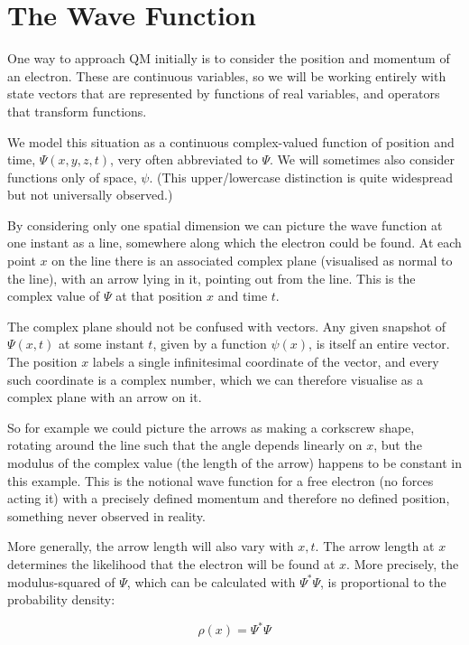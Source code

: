 \section{The Wave Function}

One way to approach QM initially is to consider the position and momentum of an electron. These are continuous variables, so we will be working entirely with state vectors that are represented by functions of real variables, and operators that transform functions.

We model this situation as a continuous complex-valued function of position and time, $\Psi(x, y, z, t)$, very often abbreviated to $\Psi$. We will sometimes also consider functions only of space, $\psi$. (This upper/lowercase distinction is quite widespread but not universally observed.)

By considering only one spatial dimension we can picture the wave function at one instant as a line, somewhere along which the electron could be found. At each point $x$ on the line there is an associated complex plane (visualised as normal to the line), with an arrow lying in it, pointing out from the line. This is the complex value of $\Psi$ at that position $x$ and time $t$.

The complex plane should not be confused with vectors. Any given snapshot of $\Psi(x, t)$ at some instant $t$, given by a function $\psi(x)$, is itself an entire vector. The position $x$ labels a single infinitesimal coordinate of the vector, and every such coordinate is a complex number, which we can therefore visualise as a complex plane with an arrow on it.

So for example we could picture the arrows as making a corkscrew shape, rotating around the line such that the angle depends linearly on $x$, but the modulus of the complex value (the length of the arrow) happens to be constant in this example. This is the notional wave function for a free electron (no forces acting it) with a precisely defined momentum and therefore no defined position, something never observed in reality.

More generally, the arrow length will also vary with $x, t$. The arrow length at $x$ determines the likelihood that the electron will be found at $x$. More precisely, the modulus-squared of $\Psi$, which can be calculated with $\Psi^*\Psi$, is proportional to the probability density:

\begin{equation}
  \rho(x) = \Psi^*\Psi
  \label{eqn:pdf}
\end{equation}

